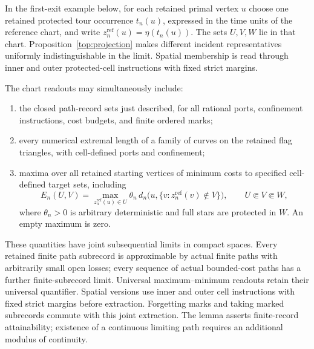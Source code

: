 In the first-exit example below, for each retained primal vertex $u$
choose one retained protected tour occurrence $t_n(u)$, expressed in the
time units of the reference chart, and write
$z_n^{\mathrm{ref}}(u)=\eta(t_n(u))$. The sets $U,V,W$ lie in that chart.
Proposition~\ref{top:projection} makes different incident representatives
uniformly indistinguishable in the limit. Spatial membership is read
through inner and outer protected-cell instructions with fixed strict margins.

\begin{lemma}\label{ker:readouts}
The chart readouts may simultaneously include:
\begin{enumerate}
\item the closed path-record sets just described, for all rational
ports, confinement instructions, cost budgets, and finite ordered marks;
\item every numerical extremal length of a family of curves on the
retained flag triangles, with cell-defined ports and confinement;
\item maxima over all retained starting vertices of minimum costs to
specified cell-defined target sets, including
\[
 E_n(U,V)=\max_{z_n^{\mathrm{ref}}(u)\in U}
       \theta_n\,d_n\bigl(u,\{v:z_n^{\mathrm{ref}}(v)\notin V\}\bigr),
 \qquad U\Subset V\Subset W,
\]
where \(\theta_n>0\) is arbitrary deterministic and full stars are protected
in \(W\).  An empty maximum is zero.
\end{enumerate}
These quantities have joint subsequential limits in compact spaces.
Every retained finite path subrecord is approximable by actual finite
paths with arbitrarily small open losses; every sequence of actual
bounded-cost paths has a further finite-subrecord limit.  Universal
maximum--minimum readouts retain their universal quantifier.  Spatial
versions use inner and outer cell instructions with fixed strict
margins before extraction.  Forgetting marks and taking marked
subrecords commute with this joint extraction.  The lemma asserts
finite-record attainability; existence of a continuous limiting path
requires an additional modulus of continuity.
\end{lemma}

